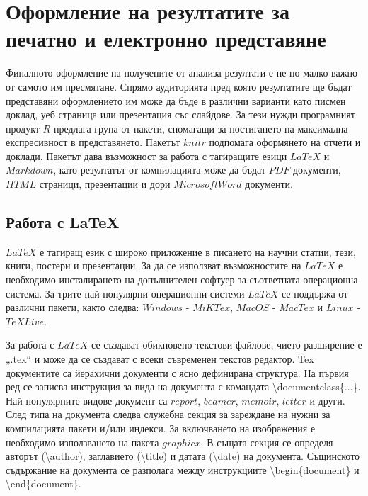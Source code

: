 \newpage
\chapter{Оформление на резултатите за печатно и електронно представяне}
\label{chapter11}
\thispagestyle{empty}

Финалното оформление на получените от анализа резултати е не по-малко важно от самото им пресмятане. Спрямо аудиторията пред която резултатите ще бъдат представяни оформлението им може да бъде в различни варианти като писмен доклад, уеб страница или презентация със слайдове. За тези нужди програмният продукт $R$ предлага група от пакети, спомагащи за постигането на максимална експресивност в представянето. Пакетът $knitr$ подпомага оформянето на отчети и доклади. Пакетът дава възможност за работа с тагиращите езици $LaTeX$ и $Markdown$\cite{markdown}, като резултатът от компилацията може да бъдат $PDF$ документи, $HTML$\cite{html} страници, презентации и дори $Microsoft Word$ документи. 

\section{Работа с LaTeX}

$LaTeX$\cite{latex} е тагиращ език с широко приложение в писането на научни статии, тези, книги, постери и презентации. За да се използват възможностите на $LaTeX$ е необходимо инсталирането на допълнителен софтуер за съответната операционна система. За трите най-популярни операционни системи $LaTeX$ се поддържа от различни пакети, както следва: $Windows$ - $MiKTex$, $MacOS$ - $MacTex$ и $Linux$ - $TeX Live$.

За работа с $LaTeX$ се създават обикновено текстови файлове, чието разширение е „.tex“ и може да се създават с всеки съвременен текстов редактор. Tex документите са йерахични документи с ясно дефинирана структура. На първия ред се записва инструкция за вида на документа с командата \textbackslash documentclass\{...\}. Най-популярните видове документ са $report$, $beamer$, $memoir$, $letter$ и други. След типа на документа следва служебна секция за зареждане на нужни за компилацията пакети и/или индекси. За включването на изображения е необходимо използването на пакета $graphicx$. В същата секция се определя авторът (\textbackslash author), заглавието (\textbackslash title) и датата (\textbackslash date) на документа. Същинското съдържание на документа се разполага между инструкциите \textbackslash begin\{document\} и \textbackslash end\{document\}.

